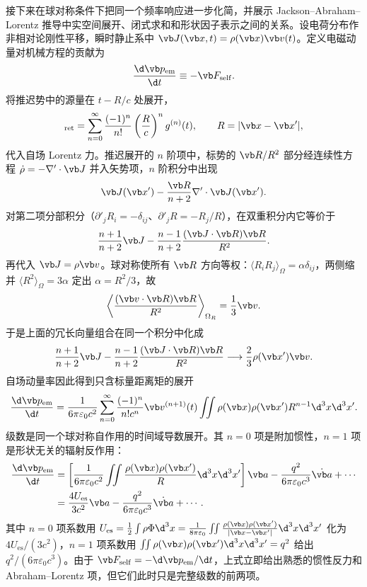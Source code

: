 接下来在球对称条件下把同一个频率响应进一步化简，并展示 Jackson--Abraham--Lorentz 推导中实空间展开、闭式求和和形状因子表示之间的关系。设电荷分布作非相对论刚性平移，瞬时静止系中 $\vb J(\vb x,t)=\rho(\vb x)\vb v(t)$。定义电磁动量对机械方程的贡献为
\begin{equation*}
 {\d\vb p_{\mathrm{em}}\over\d t}
 \equiv-\vb F_{\mathrm{self}}.
\end{equation*}
将推迟势中的源量在 $t-R/c$ 处展开，
\begin{equation*}
 [g]_{\mathrm{ret}}
 =\sum_{n=0}^\infty{(-1)^n\over n!}
 \left({R\over c}\right)^n g^{(n)}(t),
 \qquad R=|\vb x-\vb x'|,
\end{equation*}
代入自场 Lorentz 力。推迟展开的 $n$ 阶项中，标势的 $\vb R/R^2$ 部分经连续性方程 $\dot\rho=-\nabla'\cdot\vb J$ 并入矢势项，$n$ 阶积分中出现
\begin{equation*}
 \vb J(\vb x')-{\vb R\over n+2}\nabla'\cdot\vb J(\vb x').
\end{equation*}
对第二项分部积分（$\partial'_jR_i=-\delta_{ij}$、$\partial'_jR=-R_j/R$），在双重积分内它等价于
\begin{equation*}
 {n+1\over n+2}\vb J
 -{n-1\over n+2}{(\vb J\cdot\vb R)\vb R\over R^2}.
\end{equation*}
再代入 $\vb J=\rho\vb v$。球对称使所有 $\vb R$ 方向等权：$\langle R_iR_j\rangle_\Omega=\alpha\delta_{ij}$，两侧缩并 $\langle R^2\rangle_\Omega=3\alpha$ 定出 $\alpha=R^2/3$，故
\begin{equation*}
 \left\langle{(\vb v\cdot\vb R)\vb R\over R^2}\right\rangle_{\Omega_R}
 ={1\over3}\vb v.
\end{equation*}
于是上面的冗长向量组合在同一个积分中化成
\begin{equation*}
 {n+1\over n+2}\vb J
 -{n-1\over n+2}{(\vb J\cdot\vb R)\vb R\over R^2}
 \longrightarrow {2\over3}\rho(\vb x')\vb v.
\end{equation*}
自场动量率因此得到只含标量距离矩的展开
\begin{equation*}
 {\d\vb p_{\mathrm{em}}\over\d t}
 ={1\over6\pi\varepsilon_0c^2}
 \sum_{n=0}^\infty{(-1)^n\over n!c^n}
 \vb v^{(n+1)}(t)
 \iint\rho(\vb x)\rho(\vb x')R^{n-1}\d^3x\d^3x'.
\end{equation*}
级数是同一个球对称自作用的时间域导数展开。其 $n=0$ 项是附加惯性，$n=1$ 项是形状无关的辐射反作用：
\begin{align*}
 {\d\vb p_{\mathrm{em}}\over\d t}
 &=\left[{1\over6\pi\varepsilon_0c^2}
 \iint{\rho(\vb x)\rho(\vb x')\over R}\d^3x\d^3x'\right]\vb a
 -{q^2\over6\pi\varepsilon_0c^3}\dot{\vb a}+\cdots\\
 &={4U_{\mathrm{es}}\over3c^2}\vb a
 -{q^2\over6\pi\varepsilon_0c^3}\dot{\vb a}+\cdots.
\end{align*}
其中 $n=0$ 项系数用 $U_{\mathrm{es}}=\frac12\int\rho\Phi\d^3x=\frac{1}{8\pi\varepsilon_0}\iint\frac{\rho(\vb x)\rho(\vb x')}{|\vb x-\vb x'|}\d^3x\d^3x'$ 化为 $4U_{\mathrm{es}}/(3c^2)$，$n=1$ 项系数用 $\iint\rho(\vb x)\rho(\vb x')\d^3x\d^3x'=q^2$ 给出 $q^2/(6\pi\varepsilon_0c^3)$。由于 $\vb F_{\mathrm{self}}=-\d\vb p_{\mathrm{em}}/\d t$，上式立即给出熟悉的惯性反力和 Abraham--Lorentz 项，但它们此时只是完整级数的前两项。

